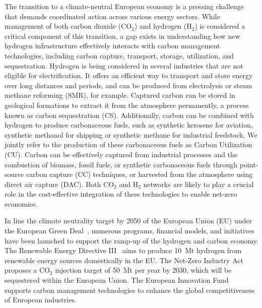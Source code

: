 \documentclass[twocolumn]{article}
\newcommand{\carbon}{CO$_2$}
\newcommand{\hydrogen}{H$_2$}
\begin{document}
The transition to a climate-neutral European economy is a pressing challenge that demands coordinated action across various energy sectors. While management of both carbon dioxide (\carbon{}) and hydrogen (\hydrogen{}) is considered a critical component of this transition, a gap exists in understanding how new hydrogen infrastructure effectively interacts with carbon management technologies, including carbon capture, transport, storage, utilization, and sequestration. Hydrogen is being considered in several industries that are not eligible for electrification. It offers an efficient way to transport and store energy over long distances and periods, and can be produced from electrolysis or steam methane reforming (SMR), for example. Captured carbon can be stored in geological formations to extract it from the atmosphere permanently, a process known as carbon sequestration (CS). Additionally, carbon can be combined with hydrogen to produce carbonaceous fuels, such as synthetic kerosene for aviation, synthetic methanol for shipping or synthetic methane for industrial feedstock. We jointly refer to the production of these carbonaceous fuels as Carbon Utilization (CU). Carbon can be effectively captured from industrial processes and the combustion of biomass, fossil fuels, or synthetic carbonaceous fuels through point-source carbon capture (CC) techniques, or harvested from the atmosphere using direct air capture (DAC). Both \carbon{} and \hydrogen{} networks are likely to play a crucial role in the cost-effective integration of these technologies to enable net-zero economies.

In line the climate neutrality target by 2050 of the European Union (EU) under the European Green Deal~\cite{europeangreendeal}, numerous programs, financial models, and initiatives have been launched to support the ramp-up of the hydrogen and carbon economy. The Renewable Energy Directive III~\cite{DirectiveEU20232023} aims to produce 10~Mt hydrogen from renewable energy sources domestically in the EU. The Net-Zero Industry Act~\cite{eu2023netzero} proposes a \carbon{} injection target of 50~Mt per year by 2030, which will be sequestered within the European Union. The European Innovation Fund~\cite{europeaninnovationfund} supports carbon management technologies to enhance the global competitiveness of European industries.
\end{document}
